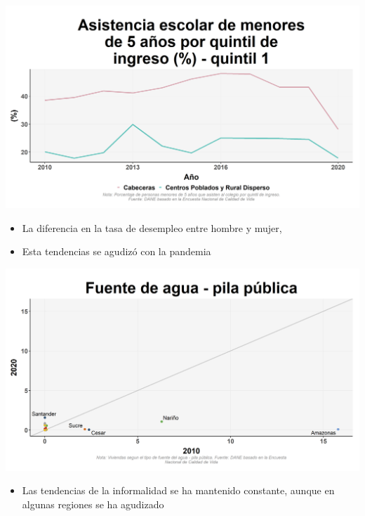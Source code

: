 \documentclass[aspectratio=169]{beamer}
\begin{document}
    \begin{slide}{14} 
            \begin{imagecolumn}
                \includegraphics[width=\columnwidth]{img/var_102_trend.png}
            \end{imagecolumn}
            \begin{textcolumn}
                \begin{itemize}
                    \item La diferencia en la tasa de desempleo entre hombre y mujer, 
                    \item Esta tendencias se agudizó con la pandemia
                \end{itemize}
            \end{textcolumn}
    \printcolumns
    \end{slide}
    
    \begin{slide}{14} 
            \begin{imagecolumn}
                \includegraphics[width=\columnwidth]{img/var_145_scatter_time.png}
            \end{imagecolumn}
            \begin{textcolumn}
                \begin{itemize}
                    \item Las tendencias de la informalidad se ha mantenido constante, aunque en algunas regiones se ha agudizado 
                \end{itemize}
            \end{textcolumn}
    \printcolumns
    \end{slide}
    
\end{document}
